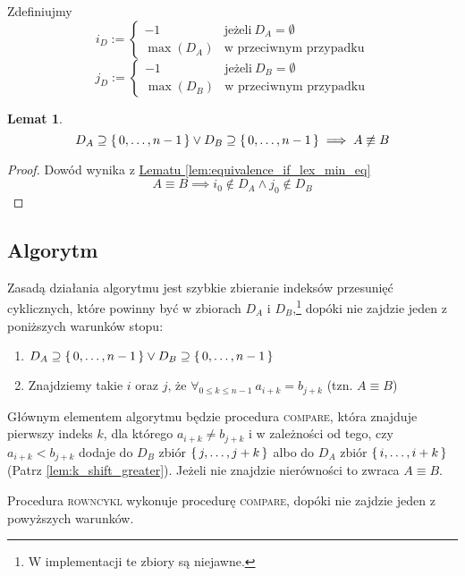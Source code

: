 \documentclass{scrartcl}
\theoremstyle{definition}
\theoremstyle{remark}
\theoremstyle{plain}
\theoremstyle{remark}
\theoremstyle{plain}
\newtheorem{lemma_1_n_in_d_no_equiv}
[lemma_equiv_if_lex_min_eq]{Lemat}
\theoremstyle{definition}
\theoremstyle{plain}
\begin{document}
Zdefiniujmy
\[i_D:=\begin{cases}
		-1        & \text{jeżeli}\ D_A=\emptyset  \\
		\max(D_A) & \text{w przeciwnym przypadku}
	\end{cases}\]
\[j_D:=\begin{cases}
		-1        & \text{jeżeli}\ D_B=\emptyset  \\
		\max(D_B) & \text{w przeciwnym przypadku}
	\end{cases}\]
\begin{lemma_1_n_in_d_no_equiv}
	\label{lem:1_n_in_d_no_equiv}
	\[D_A\supseteq\set{0,\dots,n-1}\lor
		D_B\supseteq\set{0,\dots,n-1}
		\implies A\not\equiv B\]
\end{lemma_1_n_in_d_no_equiv}
\begin{proof}
	Dowód wynika z
	\hyperref[lem:equivalence_if_lex_min_eq]
	{Lematu \ref*{lem:equivalence_if_lex_min_eq}}
	\[A\equiv B\implies i_0\notin D_A \land j_0\notin D_B\]
\end{proof}
\subsection{Algorytm}
Zasadą działania algorytmu jest szybkie zbieranie indeksów
przesunięć cyklicznych, które powinny być
w zbiorach \(D_A\) i \(D_B\),\footnote{
	W implementacji te zbiory są niejawne.
}
dopóki nie zajdzie jeden z poniższych warunków stopu:
\begin{enumerate}[label=(\arabic*)]
	\item \label{term_cond_1} \(D_A\supseteq\set{0,\dots,n-1}
	      \lor D_B\supseteq\set{0,\dots,n-1}\)
	\item \label{term_cond_2}Znajdziemy takie \(i\) oraz \(j\),
	      że \(\forall_{0\le k\le n-1}\ a_{i+k}=b_{j+k}\)
	      (tzn. \(A\equiv B\))
\end{enumerate}
Głównym elementem algorytmu będzie procedura \textsc{compare},
która znajduje pierwszy indeks \(k\),
dla którego \(a_{i+k}\neq b_{j+k}\)
i w zależności od tego, czy
\(a_{i+k}<b_{j+k}\)
dodaje do \(D_B\) zbiór \(\set{j,\dots,j+k}\)
albo do \(D_A\) zbiór \(\set{i,\dots,i+k}\)
(Patrz \cref{lem:k_shift_greater}).
Jeżeli nie znajdzie nierówności to zwraca \(A\equiv B\).

Procedura \textsc{rowncykl} wykonuje procedurę
\textsc{compare}, dopóki nie zajdzie jeden z powyższych warunków.
\pagebreak
\end{document}
